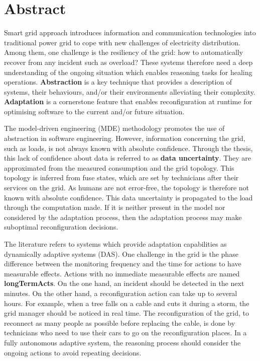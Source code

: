 \chapter*{Abstract}

\bigskip

Smart grid approach introduces information and communication technologies into traditional power grid to cope with new challenges of electricity distribution.
Among them, one challenge is the resiliency of the grid: how to automatically recover from any incident such as overload?
These systems therefore need a deep understanding of the ongoing situation which enables reasoning tasks for healing operations.
\textbf{Abstraction} is a key technique that provides a description of systems, their behaviours, and/or their environments alleviating their complexity.
\textbf{Adaptation} is a cornerstone feature that enables reconfiguration at runtime for optimising software to the current and/or future situation.

The model-driven engineering (MDE) methodology promotes the use of abstraction in software engineering.
However, information concerning the grid, such as loads, is not always known with absolute confidence.
Through the thesis, this lack of confidence about data is referred to as \textbf{data uncertainty}.
They are approximated from the measured consumption and the grid topology.
This topology is inferred from fuse states, which are set by technicians after their services on the grid.
As humans are not error-free, the topology is therefore not known with absolute confidence.
This data uncertainty is propagated to the load through the computation made.
If it is neither present in the model nor considered by the adaptation process, then the adaptation process may make suboptimal reconfiguration decisions.

The literature refers to systems which provide adaptation capabilities as dynamically adaptive systems (DAS).
One challenge in the grid is the phase difference between the monitoring frequency and the time for actions to have measurable effects.
Actions with no immediate measurable effects are named \textbf{\glspl{longTermAct}}.
On the one hand, an incident should be detected in the next minutes.
On the other hand, a reconfiguration action can take up to several hours.
For example, when a tree falls on a cable and cuts it during a storm, the grid manager should be noticed in real time.
The reconfiguration of the grid, to reconnect as many people as possible before replacing the cable, is done by technicians who need to use their cars to go on the reconfiguration places.
In a fully autonomous adaptive system, the reasoning process should consider the ongoing actions to avoid repeating decisions.


